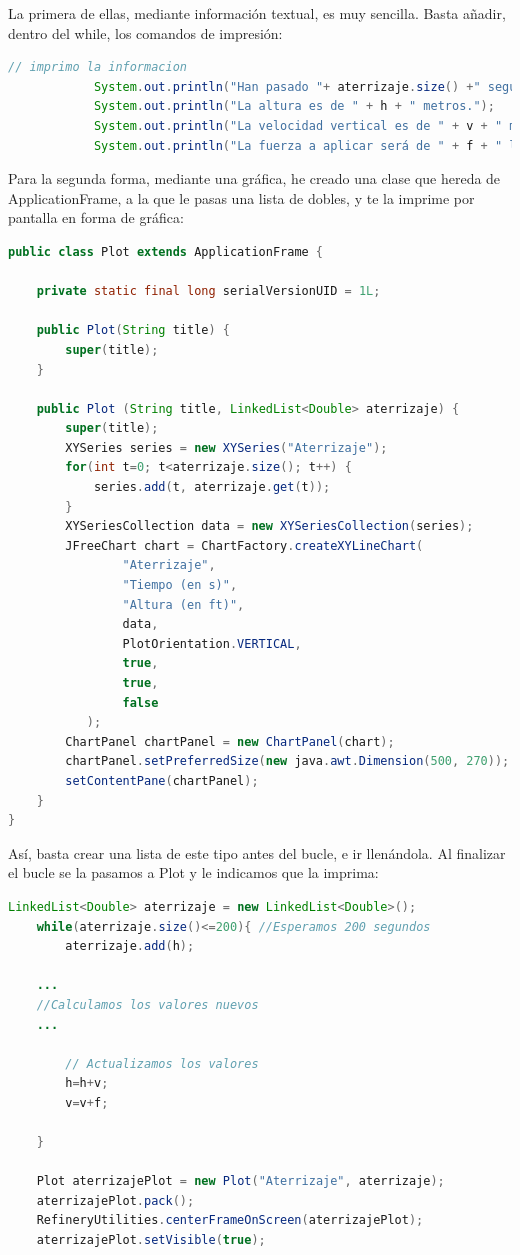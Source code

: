 \documentclass[
]{article}
\begin{document}
La primera de ellas, mediante información textual, es muy sencilla.
Basta añadir, dentro del while, los comandos de impresión:

\begin{lstlisting}[language=Java, caption=Mostramos la información por pantalla]
  // imprimo la informacion
            System.out.println("Han pasado "+ aterrizaje.size() +" segundos");
            System.out.println("La altura es de " + h + " metros.");
            System.out.println("La velocidad vertical es de " + v + " m/s.");
            System.out.println("La fuerza a aplicar será de " + f + " libras.");
\end{lstlisting}

Para la segunda forma, mediante una gráfica, he creado una clase que
hereda de ApplicationFrame, a la que le pasas una lista de dobles, y te
la imprime por pantalla en forma de gráfica:

\begin{lstlisting}[language=Java, caption=Clase Plot]
public class Plot extends ApplicationFrame {

    private static final long serialVersionUID = 1L;

    public Plot(String title) {
        super(title);
    }
    
    public Plot (String title, LinkedList<Double> aterrizaje) {
        super(title);
        XYSeries series = new XYSeries("Aterrizaje");
        for(int t=0; t<aterrizaje.size(); t++) {
            series.add(t, aterrizaje.get(t));
        }
        XYSeriesCollection data = new XYSeriesCollection(series);
        JFreeChart chart = ChartFactory.createXYLineChart(
                "Aterrizaje",
                "Tiempo (en s)", 
                "Altura (en ft)", 
                data,
                PlotOrientation.VERTICAL,
                true,
                true,
                false
           );
        ChartPanel chartPanel = new ChartPanel(chart);
        chartPanel.setPreferredSize(new java.awt.Dimension(500, 270));
        setContentPane(chartPanel);
    }
}
\end{lstlisting}

Así, basta crear una lista de este tipo antes del bucle, e ir
llenándola. Al finalizar el bucle se la pasamos a Plot y le indicamos
que la imprima:

\begin{lstlisting}[language=Java, caption=Uso de la clase Plot para imprimir la gráfica del aterrizaje]
  LinkedList<Double> aterrizaje = new LinkedList<Double>();
    while(aterrizaje.size()<=200){ //Esperamos 200 segundos
        aterrizaje.add(h);
    
    ...
    //Calculamos los valores nuevos
    ...
        
        // Actualizamos los valores
        h=h+v;
        v=v+f;
        
    }
    
    Plot aterrizajePlot = new Plot("Aterrizaje", aterrizaje);
    aterrizajePlot.pack();
    RefineryUtilities.centerFrameOnScreen(aterrizajePlot);
    aterrizajePlot.setVisible(true);
\end{lstlisting}
\end{document}
